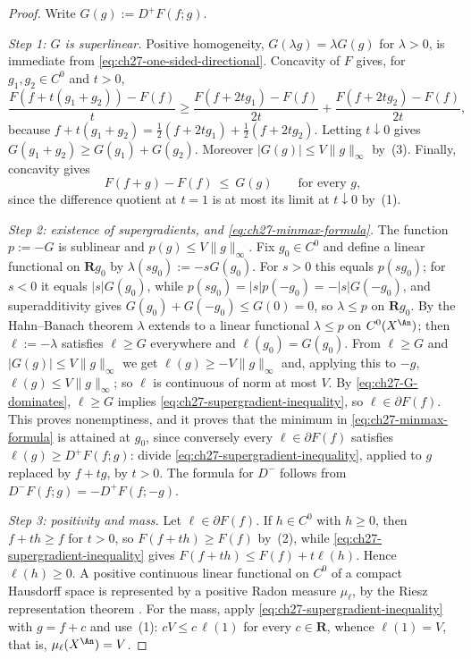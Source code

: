 \begin{proof}
Write $G(g):=D^+F(f;g)$.

\emph{Step 1: $G$ is superlinear.}
Positive homogeneity, $G(\lambda g)=\lambda G(g)$ for $\lambda>0$, is
immediate from \eqref{eq:ch27-one-sided-directional}.  Concavity of $F$
gives, for $g_1,g_2\in C^0$ and $t>0$,
\[
 \frac{F(f+t(g_1+g_2))-F(f)}{t}
 \geq\frac{F(f+2tg_1)-F(f)}{2t}+\frac{F(f+2tg_2)-F(f)}{2t},
\]
because $f+t(g_1+g_2)=\tfrac12(f+2tg_1)+\tfrac12(f+2tg_2)$.  Letting
$t\downarrow0$ gives $G(g_1+g_2)\geq G(g_1)+G(g_2)$.  Moreover
$|G(g)|\leq V\lVert g\rVert_\infty$ by
\,(3).  Finally, concavity gives
\begin{equation}\label{eq:ch27-G-dominates}
 F(f+g)-F(f)\ \leq\ G(g)
 \qquad\text{for every }g,
\end{equation}
since the difference quotient at $t=1$ is at most its limit at
$t\downarrow0$ by \,(1).

\emph{Step 2: existence of supergradients, and \eqref{eq:ch27-minmax-formula}.}
The function $p:=-G$ is sublinear and $p(g)\leq V\lVert g\rVert_\infty$.
Fix $g_0\in C^0$ and define a linear functional on $\mathbf Rg_0$ by
$\lambda(sg_0):=-sG(g_0)$.  For $s>0$ this equals $p(sg_0)$; for
$s<0$ it equals $|s|G(g_0)$, while
$p(sg_0)=|s|p(-g_0)=-|s|G(-g_0)$, and superadditivity gives
$G(g_0)+G(-g_0)\leq G(0)=0$, so $\lambda\leq p$ on $\mathbf Rg_0$.  By
the Hahn--Banach theorem $\lambda$ extends to a linear functional
$\lambda\leq p$ on $C^0(X^{\An})$; then $\ell:=-\lambda$ satisfies
$\ell\geq G$ everywhere and $\ell(g_0)=G(g_0)$.  From $\ell\geq G$ and
$|G(g)|\leq V\lVert g\rVert_\infty$ we get
$\ell(g)\geq-V\lVert g\rVert_\infty$ and, applying this to $-g$,
$\ell(g)\leq V\lVert g\rVert_\infty$; so $\ell$ is continuous of norm at
most $V$.  By \eqref{eq:ch27-G-dominates}, $\ell\geq G$ implies
\eqref{eq:ch27-supergradient-inequality}, so $\ell\in\partial F(f)$.  This
proves nonemptiness, and it proves that the minimum in
\eqref{eq:ch27-minmax-formula} is attained at $g_0$, since conversely
every $\ell\in\partial F(f)$ satisfies
$\ell(g)\geq D^+F(f;g)$: divide
\eqref{eq:ch27-supergradient-inequality}, applied to $g$ replaced by
$f+tg$, by $t>0$.  The formula for $D^-$ follows from
$D^-F(f;g)=-D^+F(f;-g)$.

\emph{Step 3: positivity and mass.}
Let $\ell\in\partial F(f)$.  If $h\in C^0$ with $h\geq0$, then
$f+th\geq f$ for $t>0$, so $F(f+th)\geq F(f)$ by
\,(2), while
\eqref{eq:ch27-supergradient-inequality} gives
$F(f+th)\leq F(f)+t\ell(h)$.  Hence $\ell(h)\geq0$.  A positive
continuous linear functional on $C^0$ of a compact Hausdorff space is
represented by a positive Radon measure $\mu_\ell$, by the Riesz
representation theorem .  For the mass, apply
\eqref{eq:ch27-supergradient-inequality} with $g=f+c$ and use
\,(1):
$cV\leq c\,\ell(1)$ for every $c\in\mathbf R$, whence
$\ell(1)=V$, that is, $\mu_\ell(X^{\An})=V$.


\end{proof}
